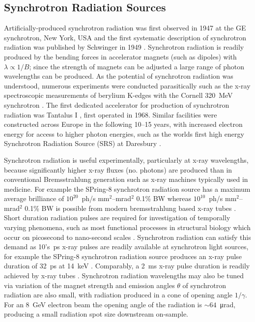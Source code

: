 \documentclass[../main.tex]{subfiles}
\begin{document}
\subsection{Synchrotron Radiation Sources}

Artificially-produced synchrotron radiation was first observed in 1947 at the GE synchrotron, New York, USA \cite{elder1948radiation} and the first systematic description of synchrotron radiation was published by Schwinger in 1949 \cite{schwinger1949classical}. Synchrotron radiation is readily produced by the bending forces in accelerator magnets (such as dipoles) with $\lambda \propto 1/B$; since the strength of magnets can be adjusted a large range of photon wavelengths can be produced. As the potential of synchrotron radiation was understood, numerous experiments were conducted parasitically such as the x-ray spectroscopic measurements of berylium K-edges with the Cornell 320~\si{\mega\electronvolt} synchrotron \cite{johnston1954absorption}. The first dedicated accelerator for production of synchrotron radiation was Tantalus I \cite{rowe1973tantalus}, first operated in 1968. Similar facilities were constructed across Europe in the following 10--15 years, with increased electron energy for access to higher photon energies, such as the worlds first high energy Synchrotron Radiation Source (SRS) at Daresbury \cite{munro2019fifty,robinson1981experiments}. 

Synchrotron radiation is useful experimentally, particularly at x-ray wavelengths, because significantly higher x-ray fluxes (no. photons) are produced than in conventional Bremsstrahlung generation such as x-ray machines typically used in medicine. For example the SPring-8 synchrotron radiation source has a maximum average brilliance of $10^{20}$~ph/\si{\second} \si{\milli\meter}$^{2}$--\si{\milli\radian}$^{2}$ 0.1\% BW \cite{spring8beamlines} whereas $10^{10}$~ph/\si{\second} \si{\milli\meter}$^{2}$--\si{\milli\radian}$^{2}$ 0.1\% BW is possible from modern bremsstrahlung based x-ray tubes \cite{behling2018diagnostic}. Short duration radiation pulses are required for investigation of temporally varying phenomena, such as most functional processes in structural biology which occur on picosecond to nano-second scales \cite{burnett2020uk}. Synchrotron radiation can satisfy this demand as 10's~\si{\pico\second} x-ray pulses are readily available at synchrotron light sources, for example the SPring-8 synchrotron radiation source produces an x-ray pulse duration of 32~\si{\pico\second} at 14~\si{\kilo\electronvolt} \cite{tanaka2001field}. Comparably, a 2~\si{\milli\second} x-ray pulse duration is readily achieved by  x-ray tubes \cite{behling2018diagnostic}. Synchrotron radiation wavelengths may also be tuned via variation of the magnet strength and emission angles $\theta$ of synchrotron radiation are also small, with radiation produced in a cone of opening angle $1/\gamma$. For an 8~\si{\giga\electronvolt} electron beam the opening angle of the radiation is $\sim 64$~\si{\micro\radian}, producing a small radiation spot size downstream on-sample.        
\end{document}
